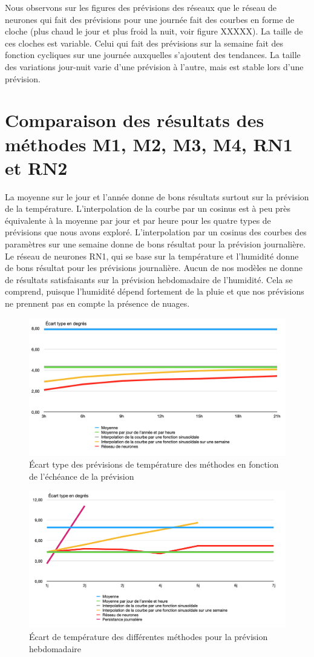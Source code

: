 \documentclass[11pt,a4paper]{article}
\begin{document}
Nous observons sur les figures des prévisions des réseaux que le réseau de neurones qui fait des prévisions pour une journée fait des courbes en forme de cloche (plus chaud le jour et plus froid la nuit, voir figure XXXXX). La taille de ces cloches est variable.
Celui qui fait des prévisions sur la semaine fait des fonction cycliques sur une journée auxquelles s'ajoutent des tendances. La taille des variations jour-nuit varie d'une prévision à l'autre, mais est stable lors d'une prévision.


\section{Comparaison des résultats des méthodes M1, M2, M3, M4, RN1 et RN2 }
La moyenne sur le jour et l'année donne de bons résultats surtout sur la prévision de la température. 
L'interpolation de la courbe par un cosinus est à peu près équivalente à la moyenne par jour et par heure pour les quatre types de prévisions que nous avons exploré.
L'interpolation par un cosinus des courbes des paramètres sur une semaine donne de bons résultat pour la prévision journalière.
Le réseau de neurones RN1, qui se base sur la température et l'humidité donne de bons résultat pour les prévisions journalière.
Aucun de nos modèles ne donne de résultats satisfaisants sur la prévision hebdomadaire de l'humidité. Cela se comprend, puisque l'humidité dépend fortement de la pluie et que nos prévisions ne prennent pas en compte la présence de nuages.

\begin{figure} [!h]
\centering
\includegraphics[width=0.7 \textwidth]{imagesTIPE/ecartjT.png}\quad
\caption{\label{fig:cosDS} Écart type des prévisions de température des méthodes en fonction de l'échéance de la prévision}
\end{figure}

\begin{figure} [!h]
\centering
\includegraphics[width=0.7 \textwidth]{imagesTIPE/ecartsT.png}\quad
\caption{\label{fig:cosDS} Écart de température des différentes méthodes pour la prévision hebdomadaire}
\end{figure}
\end{document}
